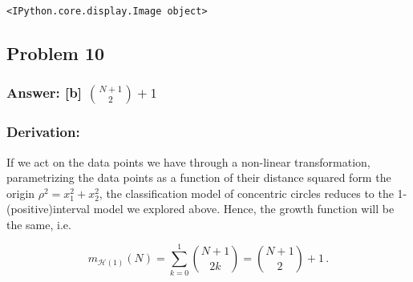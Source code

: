 \documentclass[11pt]{article}
\makeatletter
\newcommand{\boxspacing}{\kern\kvtcb@left@rule\kern\kvtcb@boxsep}
\newcommand{\prompt}[4]{
        \ttfamily\llap{{\color{#2}[#3]:\hspace{3pt}#4}}\vspace{-\baselineskip}
    }
\makeatother
\begin{document}
            \begin{tcolorbox}[breakable, size=fbox, boxrule=.5pt, pad at break*=1mm, opacityfill=0]
\prompt{Out}{outcolor}{5}{\boxspacing}
\begin{Verbatim}[commandchars=\\\{\}]
<IPython.core.display.Image object>
\end{Verbatim}
\end{tcolorbox}
        
    \hypertarget{problem-10}{%
\subsection{Problem 10}\label{problem-10}}

\hypertarget{answer-b-n1choose21}{%
\subsubsection{\texorpdfstring{Answer: {[}b{]}
\({N+1\choose2}+1\)}{Answer: {[}b{]} \{N+1\textbackslash{}choose2\}+1}}\label{answer-b-n1choose21}}

\hypertarget{derivation}{%
\subsubsection{Derivation:}\label{derivation}}

If we act on the data points we have through a non-linear
transformation, parametrizing the data points as a function of their
distance squared form the origin \(\rho^2=x_1^2+x_2^2\), the
classification model of concentric circles reduces to the
1-(positive)interval model we explored above. Hence, the growth function
will be the same, i.e.

\[
m_{\mathcal{H}(1)}(N)=\sum^1_{k=0} {N+1\choose2 k}={N+1\choose2}+1\,.
\]


    
    
    
\end{document}
